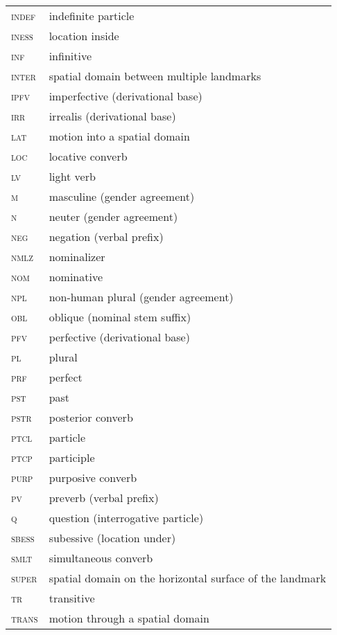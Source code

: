 ﻿\documentclass[output=paper]{langsci/langscibook}
\begin{document}
\begin{longtable}[l]{@{}ll@{}}
\textsc{indef}	& indefinite particle \\
\textsc{iness}	& location inside \\
\textsc{inf}	& infinitive \\
\textsc{inter}	& spatial domain between multiple landmarks \\
\textsc{ipfv}	& imperfective (derivational base) \\
\textsc{irr}	& irrealis (derivational base) \\
\textsc{lat}	& motion into a spatial domain \\
\textsc{loc}	& locative converb \\
\textsc{lv}	& light verb \\
\textsc{m}	& masculine (gender agreement) \\
\textsc{n}	& neuter (gender agreement) \\
\textsc{neg}	& negation (verbal prefix) \\
\textsc{nmlz}	& nominalizer \\
\textsc{nom}	& nominative \\
\textsc{npl}	& non-human plural (gender agreement) \\
\textsc{obl}	& oblique (nominal stem suffix) \\
\textsc{pfv}	& perfective (derivational base) \\
\textsc{pl}	& plural \\
\textsc{prf}	& perfect \\
\textsc{pst}	& past \\
\textsc{pstr}	& posterior converb \\
\textsc{ptcl}	& particle \\
\textsc{ptcp}	& participle \\
\textsc{purp}	& purposive converb \\
\textsc{pv}	& preverb (verbal prefix) \\
\textsc{q}	& question (interrogative particle) \\
\textsc{sbess}	& subessive (location under) \\
\textsc{smlt}	& simultaneous converb \\
\textsc{super}	& spatial domain on the horizontal surface of the landmark \\
\textsc{tr}	& transitive \\
\textsc{trans}	& motion through a spatial domain \\
\end{longtable}


\printbibliography[heading=subbibliography,notkeyword=this]
\end{document}
